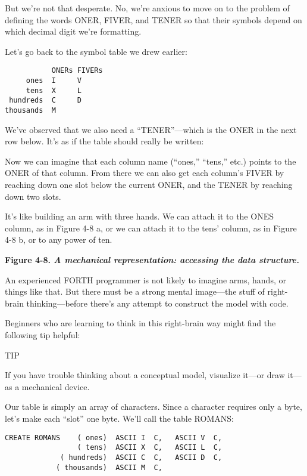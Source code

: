 But we're not that desperate. No, we're anxious to move on to the
problem of defining the words ONER, FIVER, and TENER so that their
symbols depend on which decimal digit we're formatting.

Let's go back to the symbol table we drew earlier:

\begin{verbatim}
           ONERs FIVERs
     ones  I     V
     tens  X     L
 hundreds  C     D
thousands  M
\end{verbatim}

We've observed that we also need a ``TENER''---which is the ONER in
the next row below. It's as if the table should really be written:


Now we can imagine that each column name (``ones,'' ``tens,'' etc.) points
to the ONER of that column. From there we can also get each column's
FIVER by reaching down one slot below the current ONER, and the
TENER by reaching down two slots.

It's like building an arm with three hands. We can attach it to the
ONES column, as in Figure 4-8 a, or we can attach it to the tens' column,
as in Figure 4-8 b, or to any power of ten.

\bf{Figure 4-8.} \emph{A mechanical representation: accessing the data
structure.}


An experienced FORTH programmer is not likely to imagine arms,
hands, or things like that. But there must be a strong mental image---the
stuff of right-brain thinking---before there's any attempt to construct the
model with code.

Beginners who are learning to think in this right-brain way might
find the following tip helpful:

TIP

If you have trouble thinking about a conceptual model, visualize it---or
draw it---as a mechanical device.

Our table is simply an array of characters. Since a character requires only
a byte, let's make each ``slot'' one byte. We'll call the table ROMANS:

\begin{verbatim}
CREATE ROMANS    ( ones)  ASCII I  C,   ASCII V  C,
                 ( tens)  ASCII X  C,   ASCII L  C,
             ( hundreds)  ASCII C  C,   ASCII D  C,
            ( thousands)  ASCII M  C,
\end{verbatim}

